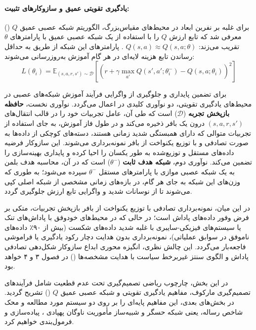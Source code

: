 \documentclass[oneside,openany,phd]{TMU-Thesis}
\begin{document}
\paragraph{یادگیری تقویتی عمیق و سازوکارهای تثبیت:}

برای غلبه بر نفرین ابعاد در محیط‌های مقیاس‌بزرگ، الگوریتم شبکه عصبی عمیق $Q$ () معرفی شد که تابع ارزش $Q$ را با استفاده از یک شبکه عصبی عمیق با پارامترهای $\theta$ تقریب می‌زند: $Q(s, a) \approx Q(s, a; \theta)$ \cite{mnih2015human}. پارامترهای این شبکه از طریق به حداقل رساندن تابع هزینه لایه‌ای در هر گام آموزش به‌روزرسانی می‌شوند:
$$L(\theta_i) = \mathbb{E}_{(s, a, r, s') \sim \mathcal{D}} \left[ \left( r + \gamma \max_{a'} Q(s', a'; \theta_i^-) - Q(s, a; \theta_i) \right)^2 \right]$$

برای تضمین پایداری و جلوگیری از واگرایی فرآیند آموزش شبکه‌های عصبی در محیط‌های یادگیری تقویتی، دو نوآوری کلیدی در  اعمال می‌گردد. نوآوری نخست، \textbf{حافظه بازپخش تجربه} ($\mathcal{D}$) است که طی آن، عامل تجربیات خود را در قالب انتقال‌های $(s, a, r, s')$ درون یک بافر ذخیره می‌کند و در طول فاز آموزش، به جای استفاده از تجربیات متوالی که دارای همبستگی شدید زمانی هستند، دسته‌های کوچکی از داده‌ها به صورت تصادفی و با توزیع یکنواخت از بافر نمونه‌برداری می‌شوند. این سازوکار فرضیه داده‌های مستقل و توزیع‌شده به طور یکسان را احیا کرده و پایداری بهینه‌سازی را تضمین می‌کند. نوآوری دوم، \textbf{شبکه هدف ثابت} ($\theta^-$) است که در آن، محاسبه هدف بلمن به یک شبکه عصبی موازی با پارامترهای مستقل $\theta^-$ سپرده می‌شود؛ به طوری که وزن‌های این شبکه به جای هر گام، در بازه‌های زمانی مشخصی از شبکه اصلی کپی می‌شوند تا از نوسانات شدید و واگرایی تابع ارزش جلوگیری گردد.

در این میان، نمونه‌برداری تصادفی با توزیع یکنواخت از بافر بازپخش تجربیات، متکی بر فرض وفور داده‌های پاداش است؛ در حالی که در محیط‌های خودوفق با پاداش‌های تنک یا سیستم‌های فیزیکی-سایبری با غلبه شدید داده‌های شکست (بیش از ۹۰٪ داده‌های ناموفق در سوابق عملیاتی)، نمونه‌برداری بدون هدایت دچار رکود یادگیری یا فراموشی فاجعه‌بار می‌گردد. این چالش نظری، انگیزه محوری ابداع سازوکار شکل‌دهی تصادفی پاداش  و الگوی سنتز غیربرخط سیاست با هدایت مشخصه‌ها (\sgos) در فصول ۳ و ۴ خواهد بود.

در این بخش، چارچوب ریاضی تصمیم‌گیری تحت عدم قطعیت شامل فرآیندهای تصمیم‌گیری مارکوف، مفاهیم یادگیری تقویتی و شبکه عصبی عمیق $Q$ () تشریح گردید. در بخش‌های بعدی، این مفاهیم پایه‌ای را بر روی دو سیستم مورد مطالعه و محک شاخص رساله، یعنی شبکه حسگر  و شبیه‌ساز مأموریت ناوگان پهپادی ، پیاده‌سازی و فرمول‌بندی خواهیم کرد.
\end{document}
